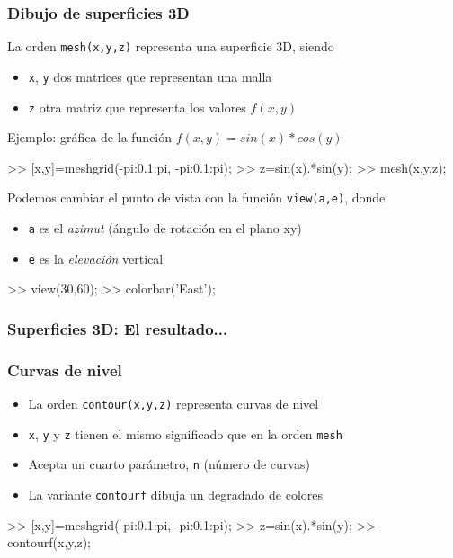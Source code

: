 \begin{frame}[containsverbatim]
  \frametitle{Dibujo de superficies 3D}
  La orden \verb|mesh(x,y,z)| representa una superficie 3D, siendo
  \begin{itemize}
  \item \verb|x|, \verb|y| dos matrices que representan una malla
  \item \verb|z| otra matriz que representa los valores $f(x,y)$
  \end{itemize}
  Ejemplo: gráfica de la función $f(x,y)=sin(x)*cos(y)$
  \begin{Octave}
    >> [x,y]=meshgrid(-pi:0.1:pi, -pi:0.1:pi);
    >> z=sin(x).*sin(y);
    >> mesh(x,y,z);
  \end{Octave}
  Podemos cambiar el punto de vista con la función \verb|view(a,e)|,
  donde 
  \begin{itemize}
  \item \verb|a| es el \emph{azimut} (ángulo de rotación en el plano xy)
  \item \verb|e| es la \emph{elevación} vertical
  \end{itemize}
  \begin{Octave}
  >> view(30,60);
  >> colorbar('East'); %
  \end{Octave}
\end{frame}

\begin{frame}\frametitle{Superficies 3D: El resultado...}
\begin{center}
\end{center}
\end{frame}

\begin{frame}[containsverbatim]
  \frametitle{Curvas de nivel}
  \begin{itemize}
  \item
    La orden \verb|contour(x,y,z)| representa curvas de nivel
  \item \verb|x|, \verb|y| y \verb|z| tienen el mismo significado que
    en la orden \verb|mesh|
  \item Acepta un cuarto parámetro, \verb|n| (número de curvas)
  \item La variante \verb|contourf| dibuja un degradado de colores
  \end{itemize}
  \begin{Octave}
  >> [x,y]=meshgrid(-pi:0.1:pi, -pi:0.1:pi);
  >> z=sin(x).*sin(y);
  >> contourf(x,y,z);    
  \end{Octave}
\end{frame}

